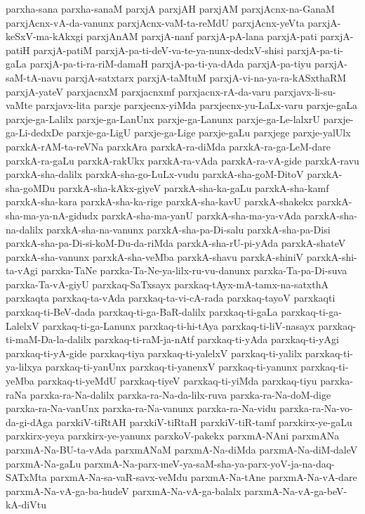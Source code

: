 {parxha-sana
parxha-sanaM
parxjA
parxjAH
parxjAM
parxjAcnx-na-GanaM
parxjAcnx-vA-da-vanunx
parxjAcnx-vaM-ta-reMdU
parxjAcnx-yeVta
parxjA-keSxV-ma-kAkxgi
parxjAnAM
parxjA-nanf
parxjA-pA-lana
parxjA-pati
parxjA-patiH
parxjA-patiM
parxjA-pa-ti-deV-va-te-ya-nunx-dedxV-shisi
parxjA-pa-ti-gaLa
parxjA-pa-ti-ra-riM-damaH
parxjA-pa-ti-ya-dAda
parxjA-pa-tiyu
parxjA-saM-tA-navu
parxjA-satxtarx
parxjA-taMtuM
parxjA-vi-na-ya-ra-kASxthaRM
parxjA-yateV
parxjacnxM
parxjacnxmf
parxjacnx-rA-da-varu
parxjavx-li-su-vaMte
parxjavx-lita
parxje
parxjecnx-yiMda
parxjecnx-yu-LaLx-varu
parxje-gaLa
parxje-ga-Lalilx
parxje-ga-LanUnx
parxje-ga-Lanunx
parxje-ga-Le-lalxrU
parxje-ga-Li-dedxDe
parxje-ga-LigU
parxje-ga-Lige
parxje-gaLu
parxjege
parxje-yalUlx
parxkA-rAM-ta-reVNa
parxkAra
parxkA-ra-diMda
parxkA-ra-ga-LeM-dare
parxkA-ra-gaLu
parxkA-rakUkx
parxkA-ra-vAda
parxkA-ra-vA-gide
parxkA-ravu
parxkA-sha-dalilx
parxkA-sha-go-LuLx-vudu
parxkA-sha-goM-DitoV
parxkA-sha-goMDu
parxkA-sha-kAkx-giyeV
parxkA-sha-ka-gaLu
parxkA-sha-kamf
parxkA-sha-kara
parxkA-sha-ka-rige
parxkA-sha-kavU
parxkA-shakekx
parxkA-sha-ma-ya-nA-gidudx
parxkA-sha-ma-yanU
parxkA-sha-ma-ya-vAda
parxkA-sha-na-dalilx
parxkA-sha-na-vanunx
parxkA-sha-pa-Di-salu
parxkA-sha-pa-Disi
parxkA-sha-pa-Di-si-koM-Du-da-riMda
parxkA-sha-rU-pi-yAda
parxkA-shateV
parxkA-sha-vanunx
parxkA-sha-veMba
parxkA-shavu
parxkA-shiniV
parxkA-shi-ta-vAgi
parxka-TaNe
parxka-Ta-Ne-ya-lilx-ru-vu-danunx
parxka-Ta-pa-Di-suva
parxka-Ta-vA-giyU
parxkaq-SaTxsayx
parxkaq-tAyx-mA-tamx-na-satxthA
parxkaqta
parxkaq-ta-vAda
parxkaq-ta-vi-cA-rada
parxkaq-tayoV
parxkaqti
parxkaq-ti-BeV-dada
parxkaq-ti-ga-BaR-dalilx
parxkaq-ti-gaLa
parxkaq-ti-ga-LalelxV
parxkaq-ti-ga-Lanunx
parxkaq-ti-hi-tAya
parxkaq-ti-liV-nasayx
parxkaq-ti-maM-Da-la-dalilx
parxkaq-ti-raM-ja-nAtf
parxkaq-ti-yAda
parxkaq-ti-yAgi
parxkaq-ti-yA-gide
parxkaq-tiya
parxkaq-ti-yalelxV
parxkaq-ti-yalilx
parxkaq-ti-ya-lilxya
parxkaq-ti-yanUnx
parxkaq-ti-yanenxV
parxkaq-ti-yanunx
parxkaq-ti-yeMba
parxkaq-ti-yeMdU
parxkaq-tiyeV
parxkaq-ti-yiMda
parxkaq-tiyu
parxka-raNa
parxka-ra-Na-dalilx
parxka-ra-Na-da-lilx-ruva
parxka-ra-Na-doM-dige
parxka-ra-Na-vanUnx
parxka-ra-Na-vanunx
parxka-ra-Na-vidu
parxka-ra-Na-vo-da-gi-dAga
parxkiV-tiRtAH
parxkiV-tiRtaH
parxkiV-tiR-tamf
parxkirx-ye-gaLu
parxkirx-yeya
parxkirx-ye-yanunx
parxkoV-pakekx
parxmA-NAni
parxmANa
parxmA-Na-BU-ta-vAda
parxmANaM
parxmA-Na-diMda
parxmA-Na-diM-daleV
parxmA-Na-gaLu
parxmA-Na-parx-meV-ya-saM-sha-ya-parx-yoV-ja-na-daq-SATxMta
parxmA-Na-sa-vaR-savx-veMdu
parxmA-Na-tAne
parxmA-Na-vA-dare
parxmA-Na-vA-ga-ba-hudeV
parxmA-Na-vA-ga-balalx
parxmA-Na-vA-ga-beV-kA-diVtu
}
